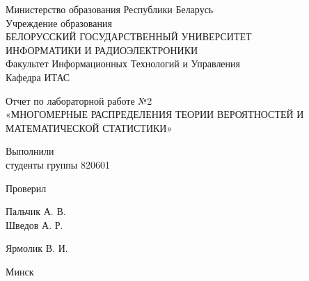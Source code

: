 \begin{titlepage}
\thispagestyle{empty}
\setlength{\parindent}{0ex} %

\begin{center}
    Министерство образования Республики Беларусь \\
    \vspace{0.5ex}
    Учреждение образования \\
    БЕЛОРУССКИЙ ГОСУДАРСТВЕННЫЙ УНИВЕРСИТЕТ \\
    ИНФОРМАТИКИ И РАДИОЭЛЕКТРОНИКИ \\
    \vspace{0.5ex}
    Факультет Информационных Технологий и Управления \\
    \vspace{0.5ex}
    Кафедра ИТАС
\end{center}

\vspace{50mm}

\begin{center}
    Отчет по лабораторной работе №2 \\
    «МНОГОМЕРНЫЕ РАСПРЕДЕЛЕНИЯ ТЕОРИИ ВЕРОЯТНОСТЕЙ И МАТЕМАТИЧЕСКОЙ СТАТИСТИКИ»
\end{center}

\vspace{50mm}

\begin{minipage}{.4\linewidth}
    Выполнили \\
    студенты группы 820601

    \smallskip

    Проверил
\end{minipage}
\hfill
\begin{minipage}{.4\linewidth}
    \begin{flushright}
        Пальчик А. В.\\
        Шведов А. Р.

        \smallskip

        Ярмолик В. И.
    \end{flushright}
\end{minipage}

\vfill
\begin{center}
  Минск \the\year{}
\end{center}

\setlength{\parindent}{1.25cm} %
\end{titlepage}
